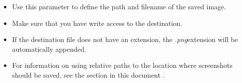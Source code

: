 \begin{itemize}
\item Use this parameter to define the path and filename of the saved image.
\item Make sure that you have write access to the destination.
\item If the destination file does not have an extension, the \emph{.png}extension will be automatically appended.
\item For information on using relative paths to the location where screenshots should be saved, see the section in this document .
\end{itemize}


